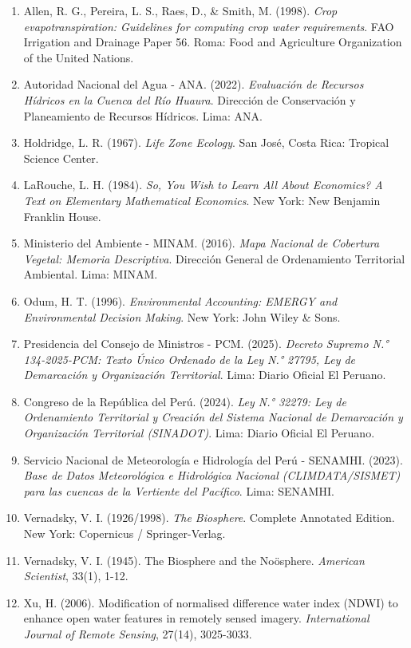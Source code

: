 \documentclass[11pt,a4paper]{article}
\begin{document}
\begin{enumerate}[leftmargin=*]
    \item Allen, R. G., Pereira, L. S., Raes, D., \& Smith, M. (1998). \textit{Crop evapotranspiration: Guidelines for computing crop water requirements}. FAO Irrigation and Drainage Paper 56. Roma: Food and Agriculture Organization of the United Nations.
    \item Autoridad Nacional del Agua - ANA. (2022). \textit{Evaluación de Recursos Hídricos en la Cuenca del Río Huaura}. Dirección de Conservación y Planeamiento de Recursos Hídricos. Lima: ANA.
    \item Holdridge, L. R. (1967). \textit{Life Zone Ecology}. San José, Costa Rica: Tropical Science Center.
    \item LaRouche, L. H. (1984). \textit{So, You Wish to Learn All About Economics? A Text on Elementary Mathematical Economics}. New York: New Benjamin Franklin House.
    \item Ministerio del Ambiente - MINAM. (2016). \textit{Mapa Nacional de Cobertura Vegetal: Memoria Descriptiva}. Dirección General de Ordenamiento Territorial Ambiental. Lima: MINAM.
    \item Odum, H. T. (1996). \textit{Environmental Accounting: EMERGY and Environmental Decision Making}. New York: John Wiley \& Sons.
    \item Presidencia del Consejo de Ministros - PCM. (2025). \textit{Decreto Supremo N.° 134-2025-PCM: Texto Único Ordenado de la Ley N.° 27795, Ley de Demarcación y Organización Territorial}. Lima: Diario Oficial El Peruano.
    \item Congreso de la República del Perú. (2024). \textit{Ley N.° 32279: Ley de Ordenamiento Territorial y Creación del Sistema Nacional de Demarcación y Organización Territorial (SINADOT)}. Lima: Diario Oficial El Peruano.
    \item Servicio Nacional de Meteorología e Hidrología del Perú - SENAMHI. (2023). \textit{Base de Datos Meteorológica e Hidrológica Nacional (CLIMDATA/SISMET) para las cuencas de la Vertiente del Pacífico}. Lima: SENAMHI.
    \item Vernadsky, V. I. (1926/1998). \textit{The Biosphere}. Complete Annotated Edition. New York: Copernicus / Springer-Verlag.
    \item Vernadsky, V. I. (1945). The Biosphere and the Noösphere. \textit{American Scientist}, 33(1), 1-12.
    \item Xu, H. (2006). Modification of normalised difference water index (NDWI) to enhance open water features in remotely sensed imagery. \textit{International Journal of Remote Sensing}, 27(14), 3025-3033.
\end{enumerate}
\end{document}
